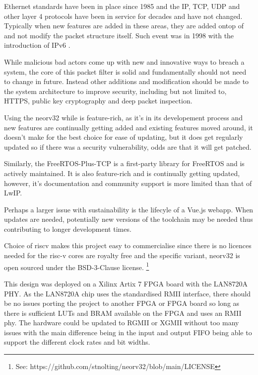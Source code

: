Ethernet standards have been in place since 1985 \cite{IEEE802.3-2012} and the IP, TCP, UDP and other layer 4 protocols have been in service for decades and have not changed. Typically when new features are added in these areas, they are added ontop of and not modify the packet structure itself. Such event was in 1998 with the introduction of IPv6 \cite{rfc2460}.

While malicious bad actors come up with new and innovative ways to breach a system, the core of this packet filter is solid and fundamentally should not need to change in future. Instead other additions and modification should be made to the system architecture to improve security, including but not limited to, HTTPS, public key cryptography and deep packet inspection.

Using the neorv32 while is feature-rich, as it's in its developement process and new features are continually getting added and existing features moved around, it doesn't make for the best choice for ease of updating, but it does get regularly updated so if there was a security vulnerability, odds are that it will get patched.

Similarly, the FreeRTOS-Plus-TCP is a first-party library for FreeRTOS and is actively maintained. It is also feature-rich and is continually getting updated, however, it's documentation and community support is more limited than that of LwIP.

Perhaps a larger issue with sustainability is the lifecyle of a Vue.js webapp. When updates are needed, potentially new versions of the toolchain may be needed thus contributing to longer development times. 

Choice of riscv makes this project easy to commercialise since there is no licences needed for the risc-v cores are royalty free and the specific variant, neorv32 is open sourced under the BSD-3-Clause license. \footnote[1]{See: https://github.com/stnolting/neorv32/blob/main/LICENSE}

This design was deployed on a Xilinx Artix 7 FPGA board with the LAN8720A PHY. As the LAN8720A chip uses the standardised RMII interface, there should be no issues porting the project to another FPGA or FPGA board so long as there is sufficient LUTs and BRAM available on the FPGA and uses an RMII phy. The hardware could be updated to RGMII or XGMII without too many issues with the main difference being in the input and output FIFO being able to support the different clock rates and bit widths.  













